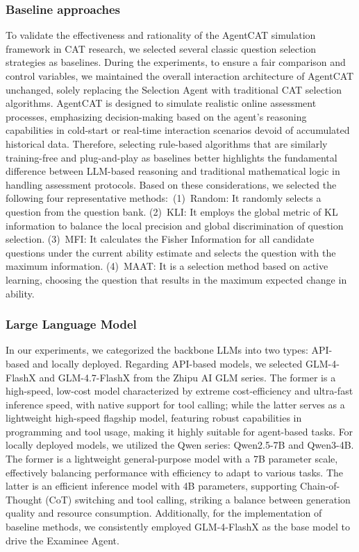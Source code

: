 \subsubsection{Baseline approaches}
To validate the effectiveness and rationality of the AgentCAT simulation framework in CAT research, we selected several classic question selection strategies as baselines. During the experiments, to ensure a fair comparison and control variables, we maintained the overall interaction architecture of AgentCAT unchanged, solely replacing the Selection Agent with traditional CAT selection algorithms. AgentCAT is designed to simulate realistic online assessment processes, emphasizing decision-making based on the agent's reasoning capabilities in cold-start or real-time interaction scenarios devoid of accumulated historical data. Therefore, selecting rule-based algorithms that are similarly training-free and plug-and-play as baselines better highlights the fundamental difference between LLM-based reasoning and traditional mathematical logic in handling assessment protocols. Based on these considerations, we selected the following four representative methods:~(1)~Random: It randomly selects a question from the question bank. (2)~KLI\cite{chang1996global}: It employs the global metric of KL information to balance the local precision and global discrimination of question selection. (3)~MFI\cite{lord2012applications}: It calculates the Fisher Information for all candidate questions under the current ability estimate  and selects the question with the maximum information. (4)~MAAT\cite{bi2020quality}: It is a selection method based on active learning, choosing the question that results in the maximum expected change in ability.


\subsubsection{Large Language Model}
In our experiments, we categorized the backbone LLMs into two types: API-based and locally deployed. Regarding API-based models, we selected GLM-4-FlashX and GLM-4.7-FlashX from the Zhipu AI GLM series. The former is a high-speed, low-cost model characterized by extreme cost-efficiency and ultra-fast inference speed, with native support for tool calling; while the latter serves as a lightweight high-speed flagship model, featuring robust capabilities in programming and tool usage, making it highly suitable for agent-based tasks. For locally deployed models, we utilized the Qwen series: Qwen2.5-7B and Qwen3-4B. The former is a lightweight general-purpose model with a 7B parameter scale, effectively balancing performance with efficiency to adapt to various tasks. The latter is an efficient inference model with 4B parameters, supporting Chain-of-Thought (CoT) switching and tool calling, striking a balance between generation quality and resource consumption. Additionally, for the implementation of baseline methods, we consistently employed GLM-4-FlashX as the base model to drive the Examinee Agent.


